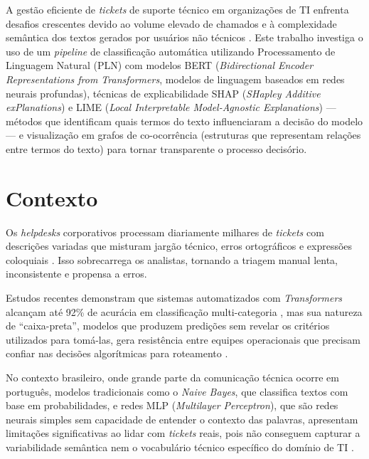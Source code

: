\documentclass[
    12pt,                %
    openright,           %
    oneside,             %
    a4paper,             %
    english,             %
    brazil               %
]{abntex2}
\begin{document}
A gestão eficiente de \textit{tickets} de suporte técnico em 
organizações de TI enfrenta desafios crescentes devido ao 
volume elevado de chamados e à complexidade semântica dos 
textos gerados por usuários não técnicos \cite{zemp2021, 
razma2026}. Este trabalho investiga o uso de um 
\textit{pipeline} de classificação automática utilizando 
Processamento de Linguagem Natural (PLN) com modelos BERT 
(\textit{Bidirectional Encoder Representations from 
Transformers}, modelos de linguagem baseados em redes neurais 
profundas), técnicas de explicabilidade SHAP 
(\textit{SHapley Additive exPlanations}) e LIME 
(\textit{Local Interpretable Model-Agnostic Explanations}) 
— métodos que identificam quais termos do texto influenciaram 
a decisão do modelo — e visualização em grafos de 
co-ocorrência (estruturas que representam relações entre 
termos do texto) para tornar transparente o processo 
decisório.

\section{Contexto}
\label{sec:contexto}

Os \textit{helpdesks} corporativos processam diariamente milhares 
de \textit{tickets} com descrições variadas que misturam jargão 
técnico, erros ortográficos e expressões coloquiais 
\cite{zemp2021}. Isso sobrecarrega os analistas, tornando a 
triagem manual lenta, inconsistente e propensa a erros.

Estudos recentes demonstram que sistemas automatizados com 
\textit{Transformers} alcançam até 92\% de acurácia em 
classificação multi-categoria \cite{zemp2021}, mas sua natureza 
de ``caixa-preta'', modelos que produzem predições sem revelar 
os critérios utilizados para tomá-las, gera resistência entre 
equipes operacionais que precisam confiar nas decisões 
algorítmicas para roteamento \cite{razma2026}.

No contexto brasileiro, onde grande parte da comunicação técnica 
ocorre em português, modelos tradicionais como o \textit{Naive 
Bayes}, que classifica textos com base em probabilidades, e redes 
MLP (\textit{Multilayer Perceptron}), que são redes neurais 
simples sem capacidade de entender o contexto das palavras, 
apresentam limitações significativas ao lidar com 
\textit{tickets} reais, pois não conseguem capturar a 
variabilidade semântica nem o vocabulário técnico específico 
do domínio de TI \cite{yokota2025}.
\end{document}
